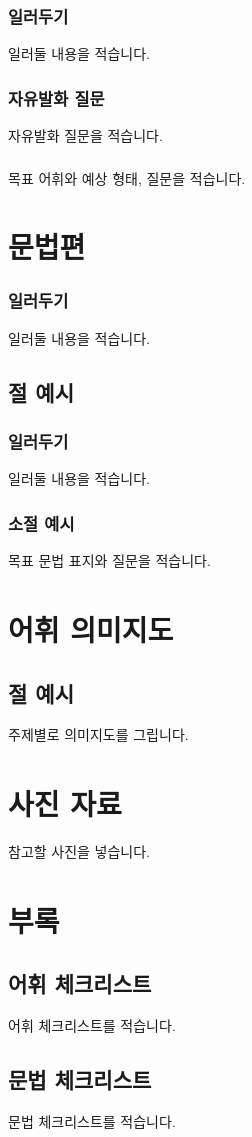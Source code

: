 \documentclass{snu-fl-questionnaire}
\begin{document}
\subsection{일러두기}
일러둘 내용을 적습니다.

\subsection{자유발화 질문}
자유발화 질문을 적습니다.

\subsection{}
목표 어휘와 예상 형태, 질문을 적습니다.


\chapter{문법편}
\subsection{일러두기}
일러둘 내용을 적습니다.

\section{절 예시}
\subsection{일러두기}
일러둘 내용을 적습니다.

\subsection{소절 예시}
목표 문법 표지와 질문을 적습니다.


\chapter{어휘 의미지도}
\section{절 예시}
주제별로 의미지도를 그립니다.


\chapter{사진 자료}
참고할 사진을 넣습니다.


\chapter*{부록}
\begin{appendices}

\section{어휘 체크리스트}
어휘 체크리스트를 적습니다.


\section{문법 체크리스트}
문법 체크리스트를 적습니다.

\end{appendices}


\backmatter
\makebackcover
\end{document}
